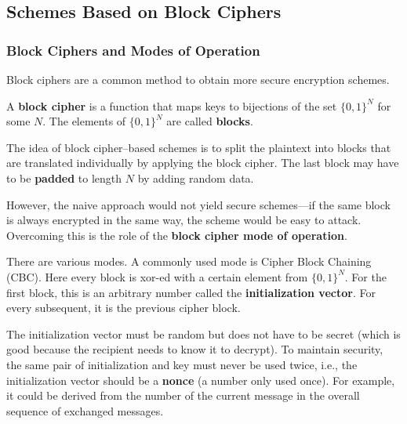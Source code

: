 \subsection{Schemes Based on Block Ciphers}

\subsubsection{Block Ciphers and Modes of Operation}

Block ciphers are a common method to obtain more secure encryption schemes.

A \textbf{block cipher} is a function that maps keys to bijections of the set $\{0,1\}^N$ for some $N$.
The elements of $\{0,1\}^N$ are called \textbf{blocks}.

The idea of block cipher--based schemes is to split the plaintext into blocks that are translated individually by applying the block cipher.
The last block may have to be \textbf{padded} to length $N$ by adding random data.

However, the naive approach would not yield secure schemes---if the same block is always encrypted in the same way, the scheme would be easy to attack.
Overcoming this is the role of the \textbf{block cipher mode of operation}.

There are various modes.
A commonly used mode is Cipher Block Chaining (CBC).
Here every block is xor-ed with a certain element from $\{0,1\}^N$.
For the first block, this is an arbitrary number called the \textbf{initialization vector}.
For every subsequent, it is the previous cipher block.

The initialization vector must be random but does not have to be secret (which is good because the recipient needs to know it to decrypt).
To maintain security, the same pair of initialization and key must never be used twice, i.e., the initialization vector should be a \textbf{nonce} (a number only used once).
For example, it could be derived from the number of the current message in the overall sequence of exchanged messages.

